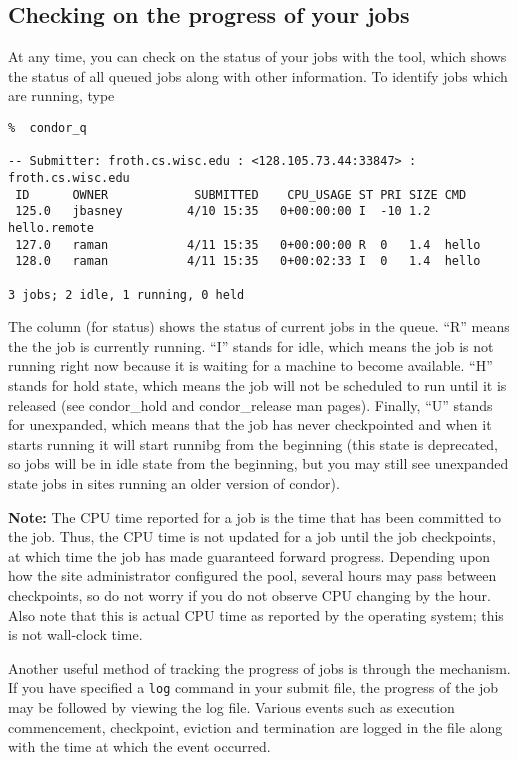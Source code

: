 \subsection{Checking on the progress of your jobs}
At any time, you can check on the status of your jobs with the 
tool, which shows the status of all queued jobs along with other information.
To identify jobs which are running, type
\begin{verbatim}
%  condor_q

-- Submitter: froth.cs.wisc.edu : <128.105.73.44:33847> : froth.cs.wisc.edu
 ID      OWNER            SUBMITTED    CPU_USAGE ST PRI SIZE CMD               
 125.0   jbasney         4/10 15:35   0+00:00:00 I  -10 1.2  hello.remote      
 127.0   raman           4/11 15:35   0+00:00:00 R  0   1.4  hello             
 128.0   raman           4/11 15:35   0+00:02:33 I  0   1.4  hello             

3 jobs; 2 idle, 1 running, 0 held

\end{verbatim} 
The \verb@ST@ column (for status) shows the status of
current jobs in the queue. ``R'' means the the job is currently
running. ``I'' stands for idle, which means the job is not running right
now because it is waiting for a machine to become available. 
``H'' stands for hold state, which means the job will not be scheduled to
run until it is released (see condor_hold and condor_release man pages).
Finally, ``U'' stands for unexpanded, which means that the job has never 
checkpointed and when it starts running it will start runnibg from the
beginning (this state is deprecated, so jobs will be in idle state
from the beginning, but you may still see unexpanded state jobs
in sites running an older version of condor).

\textbf{Note:} The CPU time reported for a job is the time that has been
committed to the job.  Thus, the CPU time is not updated for a job until
the job checkpoints, at which time the job has made guaranteed forward 
progress.  Depending upon how the site administrator configured the pool,
several hours may pass between checkpoints, so do not worry if you do
not observe CPU changing by the hour.  Also note that this is actual CPU
time as reported by the operating system; this is not wall-clock time.

Another useful method of tracking the progress of jobs is through the
 mechanism.  If you have specified a \texttt{log} command in 
your submit file, the progress of the job may be followed by viewing the
log file.  Various events such as execution commencement, checkpoint, eviction 
and termination are logged in the file along with the time at which the event 
occurred.

